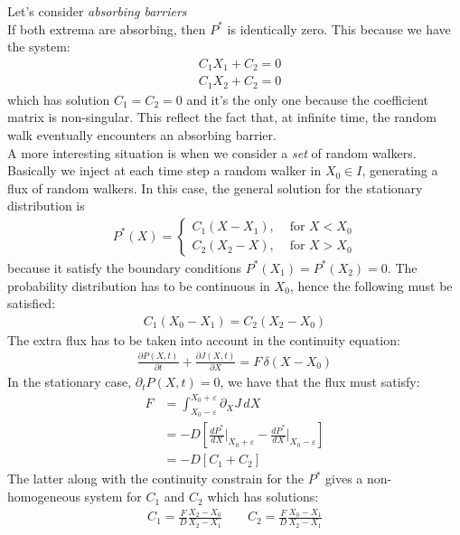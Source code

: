 \documentclass[4apaper,11pt,fleqn]{article}
\theoremstyle{remark}
\theoremstyle{definition}
\begin{document}
Let's consider \emph{absorbing barriers}\\
If both extrema are absorbing, then $P^*$ is identically zero. This because we have the system:
\begin{align*}
  &C_1 X_1 + C_2 = 0 \\
  &C_1 X_2 + C_2 = 0
\end{align*}
which has solution $C_1 = C_2 = 0$ and it's the only one because the coefficient matrix is non-singular. This reflect the fact that, at infinite time, the random walk eventually encounters an absorbing barrier. \\
A more interesting situation is when we consider a \emph{set} of random walkers. Basically we inject at each time step a random walker in $X_0 \in I$, generating a flux of random walkers.
In this case, the general solution for the stationary distribution is
\begin{align*}
  P^{*}(X)=\left\{\begin{array}{ll}{C_{1}\left(X-X_{1}\right),} & {\text { for } X<X_{0}} \\
  {C_{2}\left(X_{2}-X\right),} & {\text { for } X>X_{0}}\end{array}\right. %
\end{align*}
because it satisfy the boundary conditions $P^*(X_1)=P^*(X_2)=0$. The probability distribution has to be continuous in $X_0$, hence the following must be satisfied:
\begin{align*}
  C_{1}\left(X_{0}-X_{1}\right)=C_{2}\left(X_{2}-X_{0}\right)
\end{align*}
The extra flux has to be taken into account in the continuity equation:
\begin{align*}
  \frac{\partial P(X, t)}{\partial t}+\frac{\partial J(X, t)}{\partial X}= F \, \delta (X - X_0)
\end{align*}
In the stationary case, $\partial_t P(X,t) = 0$, we have that the flux must satisfy:
\begin{align*}
  F &= \int_{X_0 - \varepsilon}^{X_0 + \varepsilon} \partial_X J \, dX  \\
    &= -D \left[ \frac{d P^*}{dX}\Bigr|_{X_0 + \varepsilon} - \frac{d P^*}{dX}\Bigr|_{X_0 - \varepsilon} \right] \\
    &= -D [C_1 + C_2]
\end{align*}
The latter along with the continuity constrain for the $P^*$ gives a non-homogeneous system for $C_1$ and $C_2$ which has solutions:
\begin{align*}
  C_1 = \frac{F}{D} \frac{X_2 - X_0}{X_2 - X_1} \qquad C_2 = \frac{F}{D} \frac{X_0 - X_1}{X_2 - X_1}
\end{align*}
\end{document}
